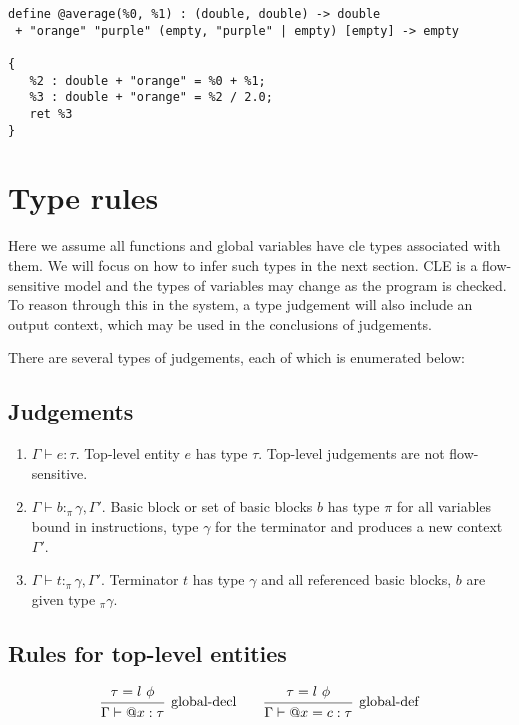 \documentclass{article}
\begin{document}
\begin{verbatim}
define @average(%0, %1) : (double, double) -> double
 + "orange" "purple" (empty, "purple" | empty) [empty] -> empty
      
{
   %2 : double + "orange" = %0 + %1;
   %3 : double + "orange" = %2 / 2.0;
   ret %3
}
\end{verbatim}

\section{Type rules}
Here we assume all functions and global variables have cle types associated with them.  We will focus on how to infer such types in the next section.
CLE is a flow-sensitive model and the types of variables may change as the program is checked.
To reason through this in the system, a type judgement will also include an output context, which may be used in the conclusions of judgements.

There are several types of judgements, each of which is enumerated below:

\subsection{Judgements}
\begin{enumerate}
    \item $\Gamma \vdash e : \tau$. 
    Top-level entity $e$ has type $\tau$. Top-level judgements are not flow-sensitive. 
    \item $\Gamma \vdash b :_\pi \gamma, \Gamma'$. 
    Basic block or set of basic blocks $b$ has type $\pi$ for all variables bound in instructions, type $\gamma$ for the terminator and produces a new context $\Gamma'$.
    \item $\Gamma \vdash t :_\pi \gamma, \Gamma'$. 
    Terminator $t$ has type $\gamma$ and all referenced basic blocks, $b$ are given type $_\pi \gamma$.
\end{enumerate}

\subsection{Rules for top-level entities}

\[    
\begin{prooftree}
    \hypo{\tau = l\ \phi}
    \infer1[global-decl]{\Gamma \vdash @x : \tau}
\end{prooftree}
\qquad
\begin{prooftree}
    \hypo{\tau = l\ \phi}
    \infer1[global-def]{\Gamma \vdash @x = c : \tau}
\end{prooftree}
\]
\end{document}
